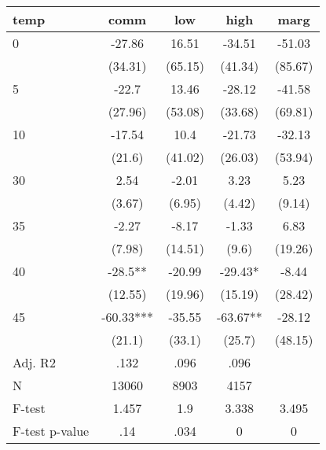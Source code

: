 \documentclass[]{article}
\begin{document}
\begin{tabular}{lcccc} \hline
temp & comm & low & high & marg \\ \hline
0 & -27.86 & 16.51 & -34.51 & -51.03 \\
 & (34.31) & (65.15) & (41.34) & (85.67) \\
5 & -22.7 & 13.46 & -28.12 & -41.58 \\
 & (27.96) & (53.08) & (33.68) & (69.81) \\
10 & -17.54 & 10.4 & -21.73 & -32.13 \\
 & (21.6) & (41.02) & (26.03) & (53.94) \\
30 & 2.54 & -2.01 & 3.23 & 5.23 \\
 & (3.67) & (6.95) & (4.42) & (9.14) \\
35 & -2.27 & -8.17 & -1.33 & 6.83 \\
 & (7.98) & (14.51) & (9.6) & (19.26) \\
40 & -28.5** & -20.99 & -29.43* & -8.44 \\
 & (12.55) & (19.96) & (15.19) & (28.42) \\
45 & -60.33*** & -35.55 & -63.67** & -28.12 \\
 & (21.1) & (33.1) & (25.7) & (48.15) \\
\hline Adj. R2 & .132 & .096 & .096 &  \\
N & 13060 & 8903 & 4157 &  \\
F-test & 1.457 & 1.9 & 3.338 & 3.495 \\
 F-test p-value & .14 & .034 & 0 & 0 \\ \hline
\end{tabular}
\end{document}
